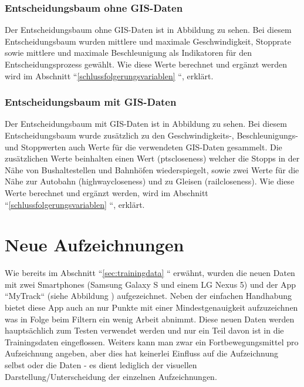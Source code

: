 
\subsubsection{Entscheidungsbaum ohne GIS-Daten}
\label{entscheidungsbaum}
Der Entscheidungsbaum ohne GIS-Daten ist in Abbildung  zu sehen. Bei diesem Entscheidungsbaum wurden mittlere und maximale Geschwindigkeit, Stopprate sowie mittlere und maximale Beschleunigung als Indikatoren für den Entscheidungsprozess gewählt. Wie diese Werte berechnet und ergänzt werden wird im Abschnitt ``\ref {schlussfolgerungsvariablen}  ``, erklärt. 

\clearpage

\subsubsection{Entscheidungsbaum mit GIS-Daten}
\label{entscheidungsbaumGIS}
Der Entscheidungsbaum mit GIS-Daten ist in Abbildung  zu sehen. Bei diesem Entscheidungsbaum wurde zusätzlich zu den Geschwindigkeits-, Beschleunigungs- und Stoppwerten auch Werte für die verwendeten GIS-Daten gesammelt. Die zusätzlichen Werte beinhalten einen Wert (ptscloseness) welcher die Stopps in der Nähe von Bushaltestellen und Bahnhöfen wiederspiegelt, sowie zwei Werte für die Nähe zur Autobahn (highwaycloseness) und zu Gleisen (railcloseness). Wie diese Werte berechnet und ergänzt werden, wird im Abschnitt ``\ref{schlussfolgerungsvariablen} ``, erklärt.

\clearpage

\section{Neue Aufzeichnungen}
Wie bereits im Abschnitt ``\ref{sec:trainingdata} `` erwähnt, wurden die neuen Daten mit zwei Smartphones (Samsung Galaxy S und einem LG Nexus 5) und der App ``MyTrack`` (siehe Abbildung ) aufgezeichnet. Neben der einfachen Handhabung bietet diese App auch an nur Punkte mit einer Mindestgenauigkeit aufzuzeichnen was in Folge beim Filtern ein wenig Arbeit abnimmt. Diese neuen Daten werden hauptsächlich zum Testen verwendet werden und nur ein Teil davon ist in die Trainingsdaten eingeflossen. Weiters kann man zwar ein Fortbewegungsmittel pro Aufzeichnung angeben, aber dies hat keinerlei Einfluss auf die Aufzeichnung selbst oder die Daten - es dient lediglich der visuellen Darstellung/Unterscheidung der einzelnen Aufzeichnungen.

